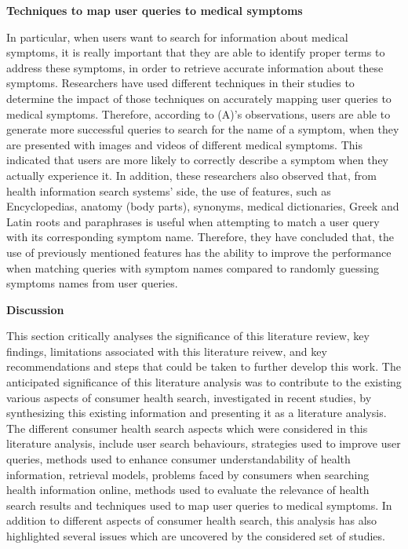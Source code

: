 \documentclass[]{article}
\begin{document}
\textbf{Techniques to map user queries to medical symptoms}


In particular, when users want to search for information about medical symptoms, it is really important that they are able to identify proper terms to address these symptoms, in order to retrieve accurate information about these symptoms. Researchers have used different techniques in their studies to determine the impact of those techniques on accurately mapping user queries to medical symptoms. Therefore, according to (A)'s observations, users are able to generate more successful queries to search for the name of a symptom, when they are presented with images and videos of different medical symptoms. This indicated that users are more likely to correctly describe a symptom when they actually experience it. In addition, these researchers also observed that, from health information search systems' side, the use of features, such as Encyclopedias, anatomy (body parts), synonyms, medical dictionaries, Greek and Latin roots and paraphrases is useful when attempting to match a user query with its corresponding symptom name. Therefore, they have concluded that, the use of previously mentioned features has the ability to improve the performance when matching queries with symptom names compared to randomly guessing symptoms names from user queries.   
	
	
\textbf{Discussion}

This section critically analyses the significance of this literature review, key findings, limitations associated with this literature reivew, and key recommendations and steps that could be taken to further develop this work. The anticipated significance of this literature analysis was to contribute to the existing various aspects of consumer health search, investigated in recent studies, by synthesizing this existing information and presenting it as a literature analysis. The different consumer health search aspects which were considered in this literature analysis, include user search behaviours, strategies used to improve user queries, methods used to enhance consumer understandability of health information, retrieval models, problems faced by consumers when searching health information online, methods used to evaluate the relevance of health search results and techniques used to map user queries to medical symptoms. In addition to different aspects of consumer health search, this analysis has also highlighted several issues which are uncovered by the considered set of studies.   
\end{document}
